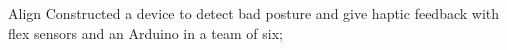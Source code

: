 \project
    {Align}
    {
        Constructed a device to detect bad posture and give haptic feedback with flex sensors and an
        Arduino in a team of six;
    }
